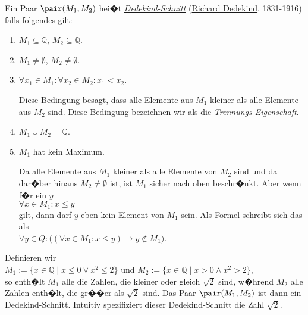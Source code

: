 \begin{Definition} \lb
Ein Paar $\pair(M_1,M_2)$ hei�t \href{http://de.wikipedia.org/wiki/Dedekindscher_Schnitt}{\emph{Dedekind-Schnitt}}
(\href{http://de.wikipedia.org/wiki/Richard_Dedekind}{\textrm{Richard Dedekind}}, 1831-1916)
falls folgendes gilt:
\begin{enumerate}
\item $M_1 \subseteq  \mathbb{Q}$, \quad $M_2 \subseteq \mathbb{Q}$.
\item $M_1 \not= \emptyset$, \quad $M_2 \not= \emptyset$.
\item $\forall x_1 \in M_1: \forall x_2 \in M_2: x_1 < x_2$.

       Diese Bedingung besagt, dass alle Elemente aus $M_1$ kleiner als alle Elemente aus $M_2$
       sind.  Diese Bedingung bezeichnen wir als die \emph{Trennungs-Eigenschaft}.
\item $M_1 \cup M_2 = \mathbb{Q}$.
\item $M_1$ hat kein Maximum.

      Da alle Elemente aus $M_1$ kleiner als alle Elemente von $M_2$ sind und da dar�ber hinaus 
      $M_2 \not= \emptyset$ ist, ist $M_1$ sicher nach oben beschr�nkt.  Aber wenn f�r ein $y$
      \\[0.2cm]
      \hspace*{1.3cm}
      $\forall x \in M_1: x \leq y$
      \\[0.2cm]
      gilt, dann darf $y$ eben kein Element von $M_1$ sein.  Als Formel schreibt sich das als
      \\[0.2cm]
      \hspace*{1.3cm}
      $\forall y \in Q: \bigl((\forall x \in M_1: x \leq y) \rightarrow y \not\in M_1\bigr)$. \eod
\end{enumerate}
\end{Definition}

\example Definieren wir
\\[0.2cm]
\hspace*{1.3cm} 
$M_1 := \{ x \in \mathbb{Q} \mid x \leq 0 \vee x^2 \leq 2 \}$ \quad und \quad
$M_2 := \{ x \in \mathbb{Q} \mid x > 0 \wedge x^2 > 2 \}$,
\\[0.2cm]
so enth�lt $M_1$ alle die Zahlen, die kleiner oder gleich $\sqrt{2}$ sind, w�hrend
$M_2$ alle Zahlen enth�lt, die gr��er als $\sqrt{2}$ sind. Das Paar $\pair(M_1,M_2)$ ist dann ein
Dedekind-Schnitt.  Intuitiv spezifiziert dieser Dedekind-Schnitt die Zahl $\sqrt{2}$.
\eox

